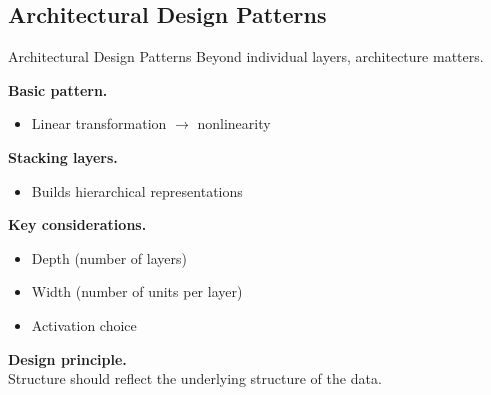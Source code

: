 \documentclass[aspectratio=169,11pt]{beamer}
\begin{document}
\subsection{Architectural Design Patterns}
\begin{frame}[t,allowframebreaks]{Architectural Design Patterns}
\small
Beyond individual layers, architecture matters.

\textbf{Basic pattern.}\\ \begin{itemize}
    \item Linear transformation $\rightarrow$ nonlinearity
\end{itemize}

\textbf{Stacking layers.}\\ \begin{itemize}
    \item Builds hierarchical representations
\end{itemize}

\textbf{Key considerations.}\\ \begin{itemize}
    \item Depth (number of layers)
    \item Width (number of units per layer)
    \item Activation choice
\end{itemize}

\textbf{Design principle.}\\ Structure should reflect the underlying structure of the data.
\end{frame}
\end{document}
